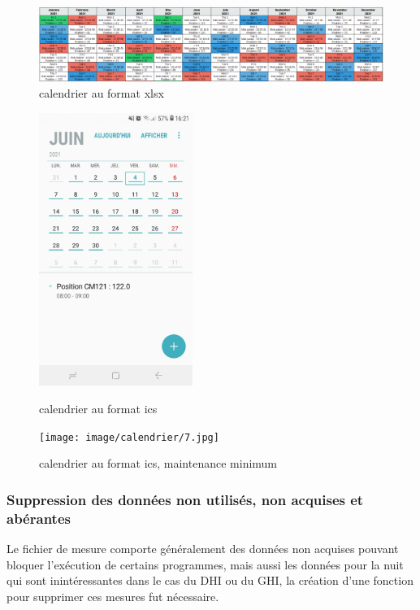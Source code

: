 \documentclass[12pt,a4paper]{article}
\begin{document}
\begin{flushleft}
\begin{figure}[H]
\centering
\includegraphics[width=16cm]{image/calendrier/2.PNG} 
\caption{calendrier au format xlsx}  
\end{figure}


\begin{figure}[H]
    \begin{minipage}[c]{.46\linewidth}
        \centering
        \includegraphics[width=5cm]{image/calendrier/4.jpg} 
		\caption{calendrier au format ics}
    \end{minipage}
    \hfill%
    \begin{minipage}[c]{.46\linewidth}
        \centering
        \texttt{[image: image/calendrier/7.jpg]} 
        \caption{calendrier au format ics, maintenance minimum}
    \end{minipage}
\end{figure}

\subsubsection{Suppression des données non utilisés, non acquises et abérantes}

Le fichier de mesure comporte généralement des données non acquises pouvant bloquer l'exécution de certains programmes, mais aussi les données pour la nuit qui sont inintéressantes dans le cas du DHI ou du GHI, la création d'une fonction pour supprimer ces mesures fut nécessaire.


\end{flushleft}
\end{document}
